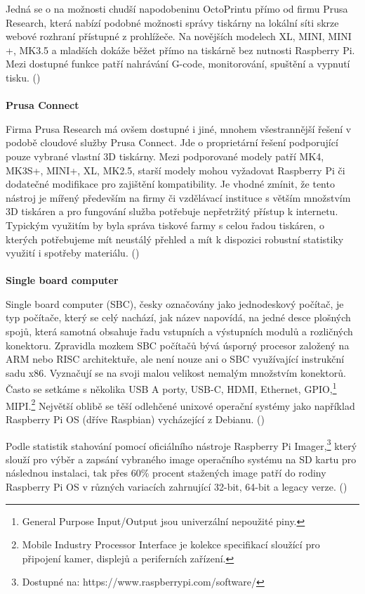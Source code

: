 \documentclass[twoside, 12pt]{article}
\begin{document}
Jedná se o na možnosti chudší napodobeninu OctoPrintu přímo od firmu Prusa Research, která nabízí podobné možnosti správy tiskárny na lokální síti skrze webové rozhraní přístupné z prohlížeče. Na novějších modelech XL, MINI, MINI +, MK3.5 a mladších dokáže běžet přímo na tiskárně bez nutnosti Raspberry Pi. Mezi dostupné funkce patří nahrávání G-code, monitorování, spuštění a vypnutí tisku. (\cite{PrusaConnectLink})
\\
\\
\textbf{Prusa Connect}

Firma Prusa Research má ovšem dostupné i jiné, mnohem všestrannější řešení v podobě cloudové služby Prusa Connect. Jde o proprietární řešení podporující pouze vybrané vlastní 3D tiskárny. Mezi podporované modely patří MK4, MK3S+, MINI+, XL, MK2.5, starší modely mohou vyžadovat Raspberry Pi či dodatečné modifikace pro zajištění kompatibility. Je vhodné zmínit, že tento nástroj je mířený především na firmy či vzdělávací instituce s větším množstvím 3D tiskáren a pro fungování služba potřebuje nepřetržitý přístup k internetu. Typickým využitím by byla správa tiskové farmy s celou řadou tiskáren, o kterých potřebujeme mít neustálý přehled a mít k dispozici robustní statistiky využití i spotřeby materiálu. (\cite{PrusaConnectLink})
\\
\\
\textbf{Single board computer}

Single board computer (SBC), česky označovány jako jednodeskový počítač, je typ počítače, který se celý nachází, jak název napovídá, na jedné desce plošných spojů, která samotná obsahuje řadu vstupních a výstupních modulů a rozličných konektoru. Zpravidla mozkem SBC počítačů bývá úsporný procesor založený na ARM nebo RISC architektuře, ale není nouze ani o SBC využívající instrukční sadu x86. Vyznačují se na svoji malou velikost nemalým množstvím konektorů. Často se setkáme s několika USB A porty, USB-C, HDMI, Ethernet, GPIO,\footnote{General Purpose Input/Output jsou univerzální nepoužité piny.} MIPI.\footnote{Mobile Industry Processor Interface je kolekce specifikací sloužící pro připojení kamer, displejů a periferních zařízení.} Největší oblibě se těší odlehčené unixové operační systémy jako například Raspberry Pi OS (dříve Raspbian) vycházející z Debianu. (\cite{RaspberryPiOS2})

 Podle statistik stahování pomocí oficiálního nástroje Raspberry Pi Imager,\footnote{Dostupné na: https://www.raspberrypi.com/software/} který slouží pro výběr a zapsání vybraného image operačního systému na SD kartu pro následnou instalaci, tak přes 60\% procent stažených image patří do rodiny Raspberry Pi OS v různých variacích zahrnující 32-bit, 64-bit a legacy verze. (\cite{RaspberryStats})
\end{document}
